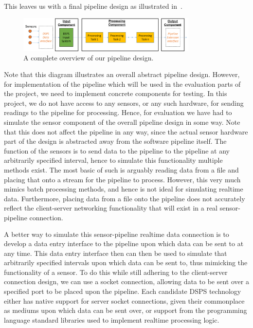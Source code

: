 This leaves us with a final pipeline design as illustrated in~.

\begin{figure}[ht]
  \centering
  \includegraphics[width=0.8\textwidth]{includes/figures/fig_pipeline_whole}
  \caption{A complete overview of our pipeline design.}
  \label{fig:pipeline_whole}
\end{figure}

Note that this diagram illustrates an overall abstract pipeline design. However, for implementation of the pipeline which
will be used in the evaluation parts of the project, we need to implement concrete components for testing. In this project,
we do not have access to any sensors, or any such hardware, for sending readings to the pipeline for processing. Hence, for evaluation
we have had to simulate the sensor component of the overall pipeline design in some way. Note that this does not affect
the pipeline in any way, since the actual sensor hardware part of the design is abstracted away from the software pipeline
itself. The function of the sensors is to send data to the pipeline to the pipeline at any arbitrarily specified interval,
hence to simulate this functionality multiple methods exist. The most basic of such is arguably reading data from a file
and placing that onto a stream for the pipeline to process. However, this very much mimics batch processing methods, and
hence is not ideal for simulating realtime data. Furthermore, placing data from a file onto the pipeline does not accurately
reflect the client-server networking functionality that will exist in a real sensor-pipeline connection.

A better way to simulate this sensor-pipeline realtime data connection is to develop a data entry interface to the pipeline upon which data can be sent to
at any time. This data entry interface then can then be used to simulate that arbitrarily specified intervals upon which data can be sent
to, thus mimicking the functionality of a sensor. To do this while still adhering to the client-server connection design,
we can use a socket connection, allowing data to be sent over a specified port to be placed upon the pipeline. Each
candidate DSPS technology either has native support for server socket connections, given their commonplace as mediums upon
which data can be sent over, or support from the programming language standard libraries used to implement realtime processing logic.

